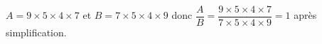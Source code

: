 
    $A=9\times 5\times 4\times 7$ et $B=7\times 5\times 4\times 9$ donc $\dfrac{A}{B}=\dfrac{9\times 5\times 4\times 7}{7\times 5\times 4\times 9} = 1$ après simplification.
